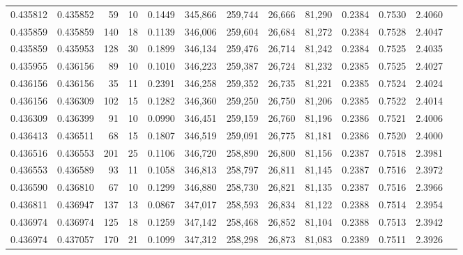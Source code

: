 \begin{tabular}{rrrrrrrrrrrrr}
0.435812 & 0.435852 &    59 &  10 &                                     0.1449 & 345,866 & 259,744 &  26,666 &  81,290 & 0.2384 & 0.7530 & 2.4060 \\
0.435859 & 0.435859 &   140 &  18 &                                     0.1139 & 346,006 & 259,604 &  26,684 &  81,272 & 0.2384 & 0.7528 & 2.4047 \\
0.435859 & 0.435953 &   128 &  30 &                                     0.1899 & 346,134 & 259,476 &  26,714 &  81,242 & 0.2384 & 0.7525 & 2.4035 \\
0.435955 & 0.436156 &    89 &  10 &                                     0.1010 & 346,223 & 259,387 &  26,724 &  81,232 & 0.2385 & 0.7525 & 2.4027 \\
0.436156 & 0.436156 &    35 &  11 &                                     0.2391 & 346,258 & 259,352 &  26,735 &  81,221 & 0.2385 & 0.7524 & 2.4024 \\
0.436156 & 0.436309 &   102 &  15 &                                     0.1282 & 346,360 & 259,250 &  26,750 &  81,206 & 0.2385 & 0.7522 & 2.4014 \\
0.436309 & 0.436399 &    91 &  10 &                                     0.0990 & 346,451 & 259,159 &  26,760 &  81,196 & 0.2386 & 0.7521 & 2.4006 \\
0.436413 & 0.436511 &    68 &  15 &                                     0.1807 & 346,519 & 259,091 &  26,775 &  81,181 & 0.2386 & 0.7520 & 2.4000 \\
0.436516 & 0.436553 &   201 &  25 &                                     0.1106 & 346,720 & 258,890 &  26,800 &  81,156 & 0.2387 & 0.7518 & 2.3981 \\
0.436553 & 0.436589 &    93 &  11 &                                     0.1058 & 346,813 & 258,797 &  26,811 &  81,145 & 0.2387 & 0.7516 & 2.3972 \\
0.436590 & 0.436810 &    67 &  10 &                                     0.1299 & 346,880 & 258,730 &  26,821 &  81,135 & 0.2387 & 0.7516 & 2.3966 \\
0.436811 & 0.436947 &   137 &  13 &                                     0.0867 & 347,017 & 258,593 &  26,834 &  81,122 & 0.2388 & 0.7514 & 2.3954 \\
0.436974 & 0.436974 &   125 &  18 &                                     0.1259 & 347,142 & 258,468 &  26,852 &  81,104 & 0.2388 & 0.7513 & 2.3942 \\
0.436974 & 0.437057 &   170 &  21 &                                     0.1099 & 347,312 & 258,298 &  26,873 &  81,083 & 0.2389 & 0.7511 & 2.3926 \\

\end{tabular}
